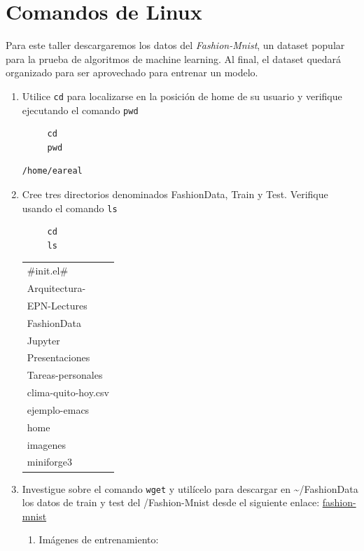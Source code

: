 \documentclass{article}
\begin{document}
\section{Comandos de Linux}
\label{sec:org3d62838}
Para este taller descargaremos los datos del \emph{Fashion-Mnist}, un
dataset popular para la prueba de algoritmos de machine learning. Al
final, el dataset quedará organizado para ser aprovechado para
entrenar un modelo.

\begin{enumerate}
\item Utilice \texttt{cd} para localizarse en la posición de home de su usuario y
verifique ejecutando el comando \texttt{pwd}

\begin{verbatim}
     cd
     pwd
\end{verbatim}

\begin{verbatim}
/home/eareal
\end{verbatim}

\item Cree tres directorios denominados FashionData, Train y
Test. Verifique usando el comando \texttt{ls}
\begin{verbatim}
     cd
     ls 
\end{verbatim}

\begin{center}
\begin{tabular}{l}
\#init.el\#\\[0pt]
Arquitectura-\\[0pt]
EPN-Lectures\\[0pt]
FashionData\\[0pt]
Jupyter\\[0pt]
Presentaciones\\[0pt]
Tareas-personales\\[0pt]
clima-quito-hoy.csv\\[0pt]
ejemplo-emacs\\[0pt]
home\\[0pt]
imagenes\\[0pt]
miniforge3\\[0pt]
\end{tabular}
\end{center}

\item Investigue sobre el comando \texttt{wget} y utilícelo para descargar en
\textasciitilde{}/FashionData los datos de train y test del /Fashion-Mnist desde el
siguiente enlace: \href{https://github.com/zalandoresearch/fashion-mnist}{fashion-mnist}
\begin{enumerate}
\item Imágenes de entrenamiento:


\end{enumerate}
\end{enumerate}
\end{document}
